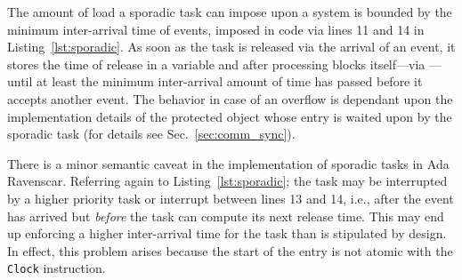 The amount of load a sporadic task can impose upon a system is bounded
by the minimum inter-arrival time of events, imposed in code via lines
11 and 14 in Listing~\ref{lst:sporadic}. As soon as the task is
released via the arrival of an event, it stores the time of release in
a variable and after processing blocks itself---via ---until at least the minimum inter-arrival amount of time has
passed before it accepts another event. The behavior in case of an
overflow is dependant upon the implementation details of the protected
object whose entry is waited upon by the sporadic task (for details
see Sec.~\ref{sec:comm_sync}).

There is a minor semantic caveat in the implementation of sporadic
tasks in Ada Ravenscar. Referring again to Listing~\ref{lst:sporadic};
the task may be interrupted by a higher priority task or interrupt
between lines 13 and 14, i.e., after the event has arrived but
\emph{before} the task can compute its next release time. This may end
up enforcing a higher inter-arrival time for the task than is
stipulated by design. In effect, this problem arises because the start
of the entry is not atomic with the \texttt{Clock} instruction.

